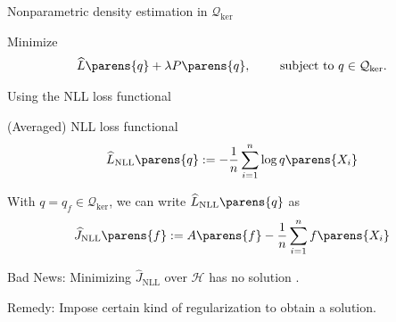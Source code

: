 \documentclass[aspectratio=169,xcolor=dvipsnames]{beamer}
\newcommand{\NLL}{\mathrm{NLL}}
\begin{document}
%	
%	
%	
%		
%	


\begin{frame}{Nonparametric density estimation in $\mathcal{Q}_{\mathrm{ker}}$}

	Minimize 
	\begin{align*}
		\widehat{L} \parens{q} + \lambda P \parens{q}, \qquad \text{ subject to } q \in \mathcal{Q}_{\mathrm{ker}}. 
	\end{align*}
	
\end{frame}



\begin{frame}{Using the NLL loss functional}
	
	(Averaged) NLL loss functional 
	\begin{align}
		\widehat{L}_{\NLL} \parens{q} := - \frac{1}{n} \sum_{i=1}^n \log q \parens{X_i}
	\end{align}
	
	With $q = q_f \in \mathcal{Q}_{\mathrm{ker}}$, we can write $\widehat{L}_{\NLL} \parens{q}$ as 
	\begin{align}
		\widehat{J}_{\NLL} \parens{f} := A \parens{f} - \frac{1}{n} \sum_{i=1}^n f \parens{X_i}
	\end{align}
	
	{\color{defaultcolor} Bad News:} Minimizing $\widehat{J}_{\NLL}$ over $\mathcal{H}$ has {\color{red} no solution} \parencite{Fukumizu2009-uu}. 
	
	\vspace{5pt}
	
	{\color{defaultcolor} Remedy:} Impose certain kind of {\color{red} regularization} to obtain a solution. 
	
\end{frame}
\end{document}
